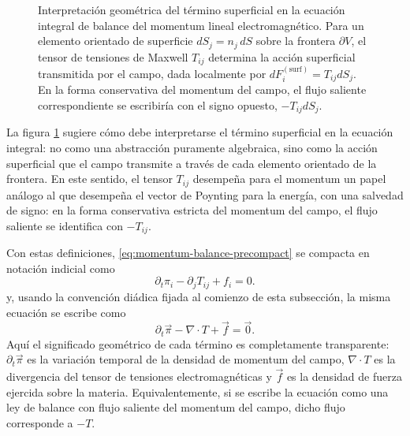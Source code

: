 \documentclass[12pt,a4paper]{article}
\theoremstyle{definition}
\theoremstyle{plain}
\numberwithin{equation}{section}
\theoremstyle{remark}
\begin{document}
\begin{figure}[ht]
    \endgroup
    \caption{Interpretación geométrica del término superficial en la ecuación integral de balance del momentum lineal electromagnético. Para un elemento orientado de superficie \(dS_j=n_j\,dS\) sobre la frontera \(\partial V\), el tensor de tensiones de Maxwell \(T_{ij}\) determina la acción superficial transmitida por el campo, dada localmente por \(dF_i^{(\mathrm{surf})}=T_{ij}dS_j\). En la forma conservativa del momentum del campo, el flujo saliente correspondiente se escribiría con el signo opuesto, \(-T_{ij}dS_j\).}
    \label{fig:maxwell-stress-surface-flux}
\end{figure}
La figura \ref{fig:maxwell-stress-surface-flux} sugiere cómo debe interpretarse el término superficial en la ecuación integral: no como una abstracción puramente algebraica, sino como la acción superficial que el campo transmite a través de cada elemento orientado de la frontera. En este sentido, el tensor \(T_{ij}\) desempeña para el momentum un papel análogo al que desempeña el vector de Poynting para la energía, con una salvedad de signo: en la forma conservativa estricta del momentum del campo, el flujo saliente se identifica con \(-T_{ij}\).

Con estas definiciones, \eqref{eq:momentum-balance-precompact} se compacta en notación indicial como
\begin{equation}
    \partial_t\pi_i-\partial_jT_{ij}+f_i=0.
    \label{eq:momentum-local-balance}
\end{equation}
y, usando la convención diádica fijada al comienzo de esta subsección, la misma ecuación se escribe como
\begin{equation}
    \partial_t\vec\pi-\nabla\cdot T+\vec f=\vec 0.
    \label{eq:momentum-local-balance-diadic}
\end{equation}
Aquí el significado geométrico de cada término es completamente transparente: $\partial_t\vec\pi$ es la variación temporal de la densidad de momentum del campo, $\nabla\cdot T$ es la divergencia del tensor de tensiones electromagnéticas y $\vec f$ es la densidad de fuerza ejercida sobre la materia. Equivalentemente, si se escribe la ecuación como una ley de balance con flujo saliente del momentum del campo, dicho flujo corresponde a $-T$.
\end{document}

